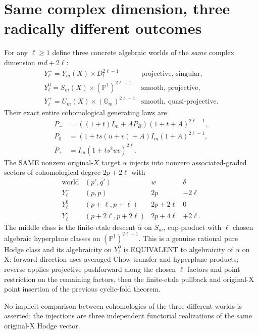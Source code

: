 \documentclass[11pt]{article}
\begin{document}
\section{Same complex dimension, three radically different outcomes}
For any $\ell\ge1$ define three concrete algebraic
worlds of the \emph{same} complex dimension $md+2\ell$:
\[
 \begin{array}{lll}
 Y^-_\ell=Y_m(X)\times D_1^{2\ell-1}
   &\text{projective, singular},\\
 Y^0_\ell=S_m(X)\times(\mathbb P^1)^{2\ell-1}
   &\text{smooth, projective},\\
 Y^+_\ell=U_m(X)\times(\mathbb G_m)^{2\ell-1}
   &\text{smooth, quasi-projective}.
 \end{array}                                             \tag{13}
\]
Their exact entire cohomological generating laws are
\[
 \boxed{\begin{aligned}
 P_-&=((1+t)I_m+A P_B)(1+t+A)^{2\ell-1},\\
 P_0&=(1+ts(u+v)+A)I_m(1+A)^{2\ell-1},\\
 P_+&=I_m(1+ts^2uv)^{2\ell}.
 \end{aligned}}                                          \tag{14}
\]
The SAME nonzero original-$X$ target $\alpha$ injects
into nonzero associated-graded sectors of cohomological
degree $2p+2\ell$ with
\[
 \boxed{
 \begin{array}{c|c|c|c}
    \text{world}&(p',q')&w&\delta\\ \hline
    Y^-_\ell&(p,p)&2p&-2\ell\\
    Y^0_\ell&(p+\ell,p+\ell)&2p+2\ell&0\\
    Y^+_\ell&(p+2\ell,p+2\ell)&2p+4\ell&+2\ell.
 \end{array}}                                             \tag{15}
\]
The middle class is the finite-etale descent
$\widehat\alpha$ on $S_m$, cup-product with
$\ell$ chosen algebraic hyperplane classes on
$(\mathbb P^1)^{2\ell-1}$. This is a genuine rational
pure Hodge class and its algebraicity on $Y^0_\ell$
is EQUIVALENT to algebraicity of $\alpha$ on X:
forward direction uses averaged Chow transfer and
hyperplane products; reverse applies projective
pushforward along the chosen $\ell$ factors and
point restriction on the remaining factors, then
the finite-etale pullback and original-X point
insertion of the previous cyclic-fold theorem.

No implicit comparison between cohomologies of the three
different worlds is asserted: the injections are three
independent functorial realizations of the same original-X
Hodge vector.
\end{document}
